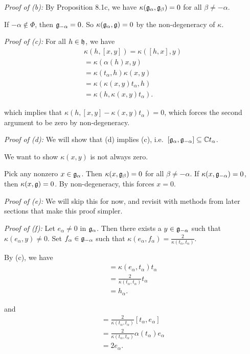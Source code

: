 \emph{Proof of (b):} By Proposition 8.1c, we have
\(\kappa({\mathfrak{g}}_\alpha, {\mathfrak{g}}_\beta) = 0\) for all
\(\beta \neq -\alpha\).

If \(-\alpha \not\in\Phi\), then \({\mathfrak{g}}_{-\alpha} = 0\). So
\(\kappa({\mathfrak{g}}_\alpha, {\mathfrak{g}}) = 0\) by the non-degeneracy of \(\kappa\).

\emph{Proof of (c):} For all \(h\in{\mathfrak{h}}\), we have \begin{align*}
\kappa(h, [x, y]) = \kappa([h, x], y) \\
= \kappa(\alpha(h)x, y) \\
= \kappa(t_\alpha, h)\kappa(x, y) \\
= \kappa(\kappa(x,y)t_\alpha, h) \\
= \kappa(h, \kappa(x,y)t_\alpha)
.\end{align*}

which implies that \(\kappa(h, [x, y] - \kappa(x,y)t_\alpha) = 0\),
which forces the second argument to be zero by non-degeneracy.

\emph{Proof of (d):} We will show that (d) implies (c),
i.e.~\([{\mathfrak{g}}_\alpha, {\mathfrak{g}}_{-\alpha}] \subseteq {\mathbb{C}} t_\alpha\).

We want to show \(\kappa(x,y)\) is not always zero.

Pick any nonzero \(x\in{\mathfrak{g}}_\alpha\). Then
\(\kappa(x, {\mathfrak{g}}_\beta) = 0\) for all \(\beta\neq -\alpha\). If
\(\kappa(x, {\mathfrak{g}}_{-\alpha}) = 0\), then \(\kappa(x, {\mathfrak{g}}) = 0\). By
non-degeneracy, this forces \(x=0\).

\emph{Proof of (e):} We will skip this for now, and revisit with methods
from later sections that make this proof simpler.

\emph{Proof of (f):} Let \(e_\alpha \neq 0\) in \({\mathfrak{g}}_\alpha\). Then
there exists a \(y\in{\mathfrak{g}}_{-\alpha}\) such that
\(\kappa(e_\alpha, y) \neq 0\). Set \(f_\alpha \in {\mathfrak{g}}_{-\alpha}\)
such that
\(\kappa(e_\alpha, f_\alpha) = \frac{2}{\kappa(t_\alpha, t_\alpha)}\).

By (c), we have \begin{align*}
[e_\alpha, f_\alpha] = \kappa(e_\alpha, t_\alpha)t_\alpha \\
= \frac{2}{\kappa(t_\alpha, t_\alpha)}t_\alpha \\
= h_\alpha
.\end{align*}

and \begin{align*}
[h_\alpha, e_\alpha] = \frac{2}{\kappa(t_\alpha, t_\alpha)}[t_\alpha, e_\alpha] \\
= \frac{2}{\kappa(t_\alpha, t_\alpha)} \alpha(t_\alpha) e_\alpha \\
= 2 e_\alpha
.\end{align*}


